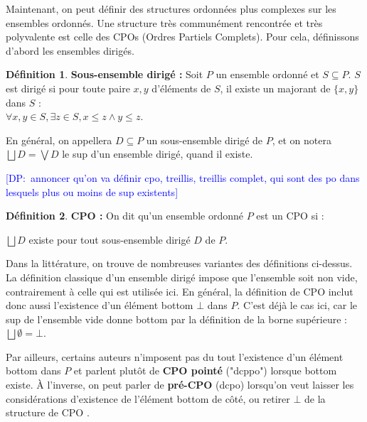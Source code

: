 \documentclass{article}
\newcommand{\yz}[1]{\textcolor{blue}{{[YZ:~#1]}}}
\newcommand\dam[1]{\textcolor{blue}{{[DP:~#1]}}}
\theoremstyle{definition}
\newtheorem{definition}{Définition}[section]
\begin{document}
Maintenant, on peut définir des structures ordonnées plus complexes sur les ensembles ordonnés. Une structure très communément rencontrée et très polyvalente est celle des CPOs (Ordres Partiels Complets). Pour cela, définissons d'abord les ensembles dirigés.

\begin{definition}{\textbf{Sous-ensemble dirigé : }}
\label{diriges}
Soit $P$ un ensemble ordonné et $S \subseteq P$. $S$ est dirigé si pour toute paire $x,y$ d'éléments de $S$, il existe un majorant de $\{x, y\}$ dans $S$ :\\ $\forall x, y \in S, \exists z \in S, x \leq z \wedge y \leq z$.

En général, on appellera $D \subseteq P$ un sous-ensemble dirigé de $P$, et on notera $\bigsqcup D = \bigvee D$ le sup d'un ensemble dirigé, quand il existe.
\end{definition}

\dam{annoncer qu'on va définir cpo, treillis, treillis complet, qui sont des po dans lesquels plus ou moins de sup existents}
\begin{definition}{\textbf{CPO :}}
On dit qu'un ensemble ordonné $P$ est un CPO si :


$\bigsqcup D$ existe pour tout sous-ensemble dirigé $D$ de $P$.
\end{definition}

Dans la littérature, on trouve de nombreuses variantes des définitions
ci-dessus. La définition classique d'un ensemble dirigé impose que l'ensemble soit non vide, contrairement à celle qui est utilisée ici. En général, la définition de CPO inclut donc aussi l'existence d'un élément bottom $\bot$ dans $P$. %
C'est déjà le cas ici, car le sup de l'ensemble vide donne bottom par la définition de la borne supérieure : ~ $\bigsqcup \emptyset = \bot$.


Par ailleurs, certains auteurs n'imposent pas du tout l'existence d'un élément bottom dans $P$ et parlent plutôt de \textbf{CPO pointé} ("dcppo") lorsque bottom existe. À l'inverse, on peut parler de \textbf{pré-CPO} (dcpo) lorsqu'on veut laisser les considérations d'existence de l'élément bottom de côté, ou retirer $\bot$ de la structure de CPO \cite[page 175]{main}.%
\end{document}
